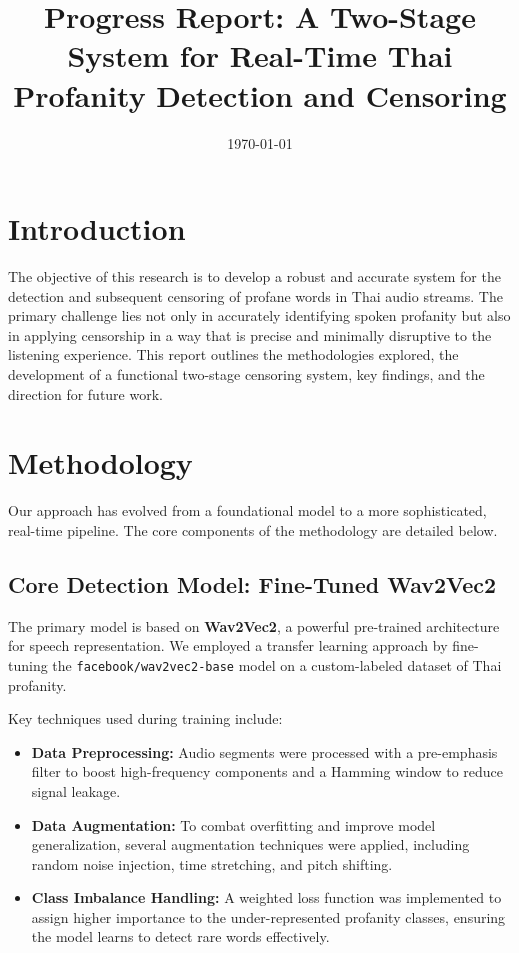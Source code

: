 \documentclass{article}
\title{Progress Report: A Two-Stage System for Real-Time Thai Profanity Detection and Censoring}
\date{\today}
\begin{document}
\maketitle

\section{Introduction}

The objective of this research is to develop a robust and accurate system for the detection and subsequent censoring of profane words in Thai audio streams. The primary challenge lies not only in accurately identifying spoken profanity but also in applying censorship in a way that is precise and minimally disruptive to the listening experience. This report outlines the methodologies explored, the development of a functional two-stage censoring system, key findings, and the direction for future work.

\section{Methodology}

Our approach has evolved from a foundational model to a more sophisticated, real-time pipeline. The core components of the methodology are detailed below.

\subsection{Core Detection Model: Fine-Tuned Wav2Vec2}

The primary model is based on \textbf{Wav2Vec2}, a powerful pre-trained architecture for speech representation. We employed a transfer learning approach by fine-tuning the \texttt{facebook/wav2vec2-base} model on a custom-labeled dataset of Thai profanity.

Key techniques used during training include:
\begin{itemize}
    \item \textbf{Data Preprocessing:} Audio segments were processed with a pre-emphasis filter to boost high-frequency components and a Hamming window to reduce signal leakage.
    \item \textbf{Data Augmentation:} To combat overfitting and improve model generalization, several augmentation techniques were applied, including random noise injection, time stretching, and pitch shifting.
    \item \textbf{Class Imbalance Handling:} A weighted loss function was implemented to assign higher importance to the under-represented profanity classes, ensuring the model learns to detect rare words effectively.
\end{itemize}
\end{document}
